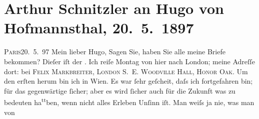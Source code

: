 

         
         \renewcommand{\erwaehntePersonen}{Personen: Richard Beer-Hofmann, Paul Goldmann, Hugo von Hofmannsthal, Hugo August von Hofmannsthal, Anna von Hofmannsthal, Felix Markbreiter}
         \renewcommand{\erwaehnteOrte}{Orte: Bad Ischl, Bayreuth, Honor Oak, London, Paris, Riesengebirge, Wien}
         \renewcommand{\erwaehnteWerke}{}
               \section[Arthur Schnitzler an Hugo von Hofmannsthal, 20. 5. 1897]{ Arthur Schnitzler an Hugo von Hofmannsthal, 20. 5. 1897}\nopagebreak{}\rehead{ }\begin{ledgroupsized}[t]{13cm}\normalsize\beginnumbering{} \toendnotes[C]{\smallbreak\pagebreak[2]} 
\toendnotes[C]{\smallbreak}\pstart
           \raggedleft{}{\pb}\textsc{Paris}20. 5. 97\pend
           \pstart
           Mein lieber Hugo, Sagen Sie, haben Sie alle meine Briefe bekommen?
               Dieſer iſt der \uline{\label{K_L00679-1v}\label{K_L00679-1h}}.\pend
           \pstart
           Ich reiſe Montag von hier nach London; meine
               Adreſſe dort: bei \textsc{Felix Markbreiter, London S. E. Woodville Hall, Honor Oak.}\pend
           \pstart
           Um den erſten herum bin ich in Wien.
               Es war ſehr geſcheit, daſs ich fortgefahren bin; für {\pb}das
               gegenwärtige ſicher; aber es wird ſicher auch für die Zukunft was zu bedeuten ha\substVorne{}\textsuperscript{tt}\substDazwischen{}b\substHinten{}en, wenn nicht alles Erleben Unſinn iſt. Man weiſs ja nie, was man von

\end{ledgroupsized}
